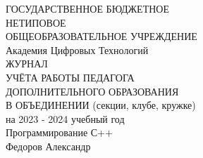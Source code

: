 \documentclass{article}
\begin{document}
\thispagestyle{empty}
\begin{center}
 {\huge ГОСУДАРСТВЕННОЕ БЮДЖЕТНОЕ }
  \\
\vspace{5mm} %
 {\huge НЕТИПОВОЕ }
  \\
\vspace{5mm} %
 {\huge ОБЩЕОБРАЗОВАТЕЛЬНОЕ УЧРЕЖДЕНИЕ }
 \\
\vspace{5mm} %
{\huge  
Академия Цифровых Технологий
 }
 \\
\vspace{50mm} %
{\huge  ЖУРНАЛ }
\\
\vspace{30mm} %
{\huge УЧЁТА РАБОТЫ ПЕДАГОГА }
\\
\vspace{2mm} %
{\huge ДОПОЛНИТЕЛЬНОГО ОБРАЗОВАНИЯ }
\\
\vspace{2mm} %
{\huge  В ОБЪЕДИНЕНИИ (секции, клубе, кружке) }
\\
\vspace{2mm} %
{\huge  на 2023 - 2024 учебный год }
\\
\vspace{50mm} %
{\huge 
Программирование С++
 }
\\
\vspace{2mm} %
{\huge 
Федоров Александр
 }
\end{center}
\clearpage
\restoregeometry

\clearpage

\newpage
\thispagestyle{empty}
\mbox{}
\newpage

\clearpage
\end{document}
